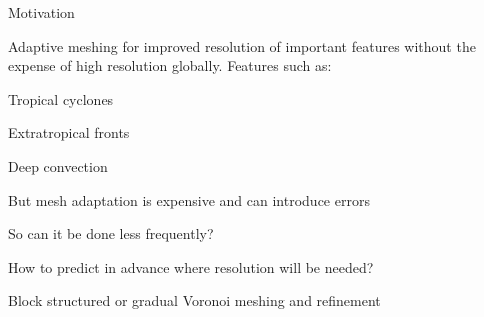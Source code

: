 \begin{slide}{Motivation}

\begin{list0}

    \item Adaptive meshing for improved resolution of important features without the expense of high resolution globally. Features such as:
    \begin{list1}
        \item Tropical cyclones
        \item Extratropical fronts
        \item Deep convection
    \end{list1}

    \item But mesh adaptation is expensive and can introduce errors

    \item So can it be done less frequently?

    \item How to predict in advance where resolution will be needed?

    \item Block structured or gradual Voronoi meshing and refinement

\end{list0}

\end{slide}
